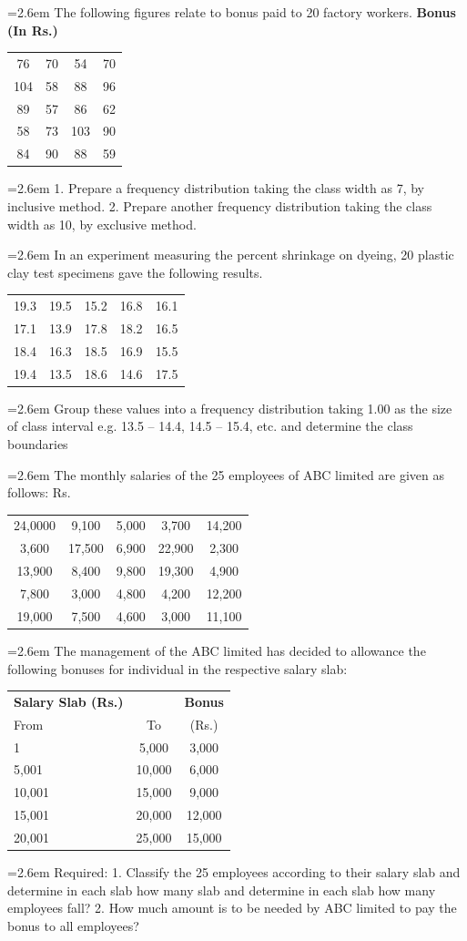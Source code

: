 \documentclass[11pt,a4paper]{article}
\newcommand{\Q}[2]{\par\smallskip\noindent\hangindent=2.6em\hangafter=1
  \makebox[2.6em][l]{\textbf{#1.}}#2\par}
\newcommand{\cont}[1]{\par\noindent\hangindent=2.6em\hangafter=-100 #1}
\newcommand{\dtab}[2]{\par\smallskip\noindent\hspace*{2.6em}\begin{tabular}{#1}\hline #2\\ \hline\end{tabular}\par\smallskip}
\begin{document}
\Q{8}{The following figures relate to bonus paid to 20 factory workers. \textbf{Bonus (In Rs.)}\dtab{|c@{\hspace{3em}}c@{\hspace{3em}}c@{\hspace{3em}}c|}{76 & 70 & 54 & 70 \\ 104 & 58 & 88 & 96 \\ 89 & 57 & 86 & 62 \\ 58 & 73 & 103 & 90 \\ 84 & 90 & 88 & 59}\cont{1. Prepare a frequency distribution taking the class width as 7, by inclusive method. 2. Prepare another frequency distribution taking the class width as 10, by exclusive method.}}
\Q{9}{In an experiment measuring the percent shrinkage on dyeing, 20 plastic clay test specimens gave the following results.\dtab{|c@{\hspace{2em}}c@{\hspace{2em}}c@{\hspace{2em}}c@{\hspace{2em}}c|}{19.3 & 19.5 & 15.2 & 16.8 & 16.1 \\ 17.1 & 13.9 & 17.8 & 18.2 & 16.5 \\ 18.4 & 16.3 & 18.5 & 16.9 & 15.5 \\ 19.4 & 13.5 & 18.6 & 14.6 & 17.5}\cont{Group these values into a frequency distribution taking 1.00 as the size of class interval e.g. 13.5 -- 14.4, 14.5 -- 15.4, etc. and determine the class boundaries}}
\Q{10}{The monthly salaries of the 25 employees of ABC limited are given as follows: \underline{\hspace{3em}} Rs. \underline{\hspace{3em}}\dtab{|c@{\hspace{2em}}c@{\hspace{2em}}c@{\hspace{2em}}c@{\hspace{2em}}c|}{24,0000 & 9,100 & 5,000 & 3,700 & 14,200 \\ 3,600 & 17,500 & 6,900 & 22,900 & 2,300 \\ 13,900 & 8,400 & 9,800 & 19,300 & 4,900 \\ 7,800 & 3,000 & 4,800 & 4,200 & 12,200 \\ 19,000 & 7,500 & 4,600 & 3,000 & 11,100}\cont{The management of the ABC limited has decided to allowance the following bonuses for individual in the respective salary slab:}\dtab{|l@{\hspace{3em}}c@{\hspace{3em}}c|}{\textbf{Salary Slab (Rs.)} &  & \textbf{Bonus} \\ From & To & (Rs.) \\ 1 & 5,000 & 3,000 \\ 5,001 & 10,000 & 6,000 \\ 10,001 & 15,000 & 9,000 \\ 15,001 & 20,000 & 12,000 \\ 20,001 & 25,000 & 15,000}\cont{Required: 1. Classify the 25 employees according to their salary slab and determine in each slab how many slab and determine in each slab how many employees fall? 2. How much amount is to be needed by ABC limited to pay the bonus to all employees?}}
\end{document}

